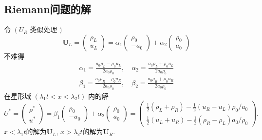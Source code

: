\documentclass[12pt]{article}
\begin{document}
\subsection{Riemann问题的解}



令 $\left(U_{R}\right.$ 类似处理 $)$
\begin{equation}
	\boldsymbol{U}_{L}=\left(\begin{array}{l}
		\rho_{L} \\
		u_{L}
		\end{array}\right)=\alpha_{1}\left(\begin{array}{c}
		\rho_{0} \\
		-a_{0}
		\end{array}\right)+\alpha_{2}\left(\begin{array}{l}
		\rho_{0} \\
		a_{0}
		\end{array}\right)
\end{equation}
不难得
\begin{align}
	\alpha_{1}=\frac{a_{0} \rho_{L}-\rho_{0} u_{L}}{2 a_{0} \rho_{0}},\ & \alpha_{2}=\frac{a_{0} \rho_{L}+\rho_{0} u_{L}}{2 a_{0} \rho_{0}} \\
	\beta_{1}=\frac{a_{0} \rho_{R}-\rho_{0} u_{R}}{2 a_{0} \rho_{0}},\ & \beta_{2}=\frac{a_{0} \rho_{R}+\rho_{0} u_{R}}{2 a_{0} \rho_{0}}
\end{align}
在星形域 $\left(\lambda_{1} t<x<\lambda_{2} t\right)$ 内的解
\begin{equation}
	U^{*}=\left(\begin{array}{l}
		\rho^{*} \\
		u^{*}
		\end{array}\right)=\beta_{1}\left(\begin{array}{c}
		\rho_{0} \\
		-a_{0}
		\end{array}\right)+\alpha_{2}\left(\begin{array}{l}
		\rho_{0} \\
		a_{0}
		\end{array}\right)=\left(\begin{array}{l}
		\frac{1}{2}\left(\rho_{L}+\rho_{R}\right)-\frac{1}{2}\left(u_{R}-u_{L}\right) \rho_{0} / a_{0} \\
		\frac{1}{2}\left(u_{L}+u_{R}\right)-\frac{1}{2}\left(\rho_{R}-\rho_{L}\right) a_{0} / \rho_{0}
		\end{array}\right).
\end{equation}
$x<\lambda_1t$的解为$\bm{U}_L$, $x>\lambda_2t$的解为$\bm{U}_R$.















\end{document}
